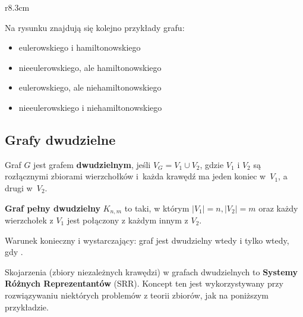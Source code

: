 \begin{example}
\begin{wrapfigure}{r}{8.3cm}
    \end{wrapfigure}
    Na rysunku znajdują się kolejno przykłady grafu:
    \begin{itemize}
        \item eulerowskiego i hamiltonowskiego
        \item nieeulerowskiego, ale hamiltonowskiego
        \item eulerowskiego, ale niehamiltonowskiego
        \item nieeulerowskiego i niehamiltonowskiego
    \end{itemize}
\end{example}

\subsection{Grafy dwudzielne}

Graf $G$ jest grafem \textbf{dwudzielnym}, jeśli $V_G = V_1 \cup V_2$, gdzie $V_1$ i $V_2$ są rozłącznymi zbiorami wierzchołków i~każda krawędź ma jeden koniec w~$V_1$, a drugi w~$V_2$.

\textbf{Graf pełny dwudzielny} $K_{n, m}$ to taki, w którym $|V_1| = n, |V_2| = m$ oraz każdy wierzchołek z $V_1$ jest połączony z każdym innym z $V_2$.

Warunek konieczny i wystarczający: graf jest dwudzielny wtedy i tylko wtedy, gdy .
\bigskip

Skojarzenia (zbiory niezależnych krawędzi) w grafach dwudzielnych to \textbf{Systemy Różnych Reprezentantów} (SRR). Koncept ten jest wykorzystywany przy rozwiązywaniu niektórych problemów z teorii zbiorów, jak na poniższym przykładzie.

